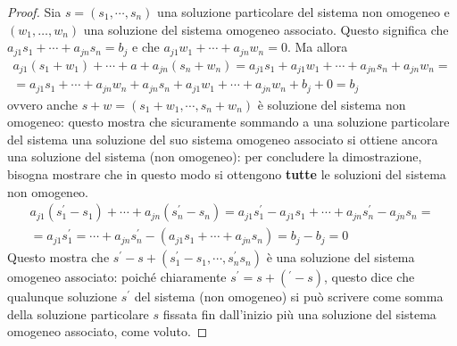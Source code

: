 \begin{proof}
  Sia $s=(s_1,\cdots, s_n)$ una soluzione particolare del sistema non
  omogeneo e\\ $(w_1,\dots,w_n)$ una soluzione del sistema omogeneo
  associato. Questo significa che $a_{j1}s_1+\cdots+a_{jn}s_n=b_j$ e
  che $a_{j1}w_1+\cdots+a_{jn}w_{n}=0$. Ma allora
  \begin{eqnarray*}
    a_{j1}(s_1+w_1)+\cdots+a+a_{jn}(s_n+w_n)=a_{j1}s_1+a_{j1}w_1+\cdots+a_{jn}s_n+a_{jn}w_n=\\
    =a_{j1}s_1+\cdots+a_{jn}w_n+a_{jn}s_n+a_{j1}w_1+\cdots+a_{jn}w_n+b_j+0=b_j
  \end{eqnarray*}
  ovvero anche $s+w=(s_1+w_1,\cdots,s_n+w_n)$ è soluzione del sistema non
  omogeneo: questo mostra che sicuramente sommando a una soluzione
  particolare del sistema una soluzione del suo sistema omogeneo associato
  si ottiene ancora una soluzione del sistema (non omogeneo): per concludere
  la dimostrazione, bisogna mostrare che in questo modo si ottengono
  \textbf{tutte} le soluzioni del sistema non omogeneo.
  \begin{eqnarray*}
    a_{j1}(s_1^\prime-s_1)+\cdots+a_{jn}(s_n^\prime-s_n)=a_{j1}s_1^\prime-a_{j1}s_1+\cdots+a_{jn}s_n^\prime
    -a_{jn}s_n=\\
    =a_{j1}s_1^\prime=\cdots+a_{jn}s_n^\prime-(a_{j1}s_1+\cdots+a_{jn}s_n)=b_j-b_j=0
  \end{eqnarray*}
  Questo mostra che $s^\prime-s+(s_1^\prime-s_1,\cdots,s_n^\prime s_n)$ è una
  soluzione del sistema omogeneo associato: poiché chiaramente
  $s^\prime=s+(^\prime-s)$, questo dice che qualunque soluzione $s^\prime$ del
  sistema (non omogeneo) si può scrivere come somma della soluzione particolare
  $s$ fissata fin dall'inizio più una soluzione del sistema omogeneo associato,
  come voluto.
\end{proof}
